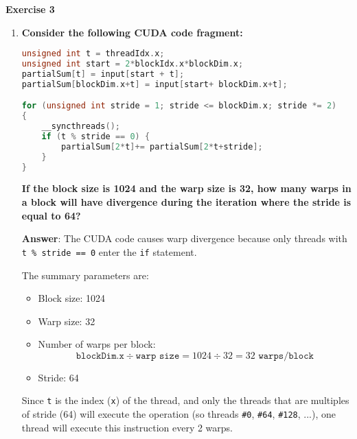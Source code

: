 \begin{flushleft}
    \textcolor{Green3}{ \textbf{Exercise 3}}
\end{flushleft}
\begin{enumerate}[label=\Alph*.]
    \item \textcolor{Green3}{\textbf{%
        Consider the following CUDA code fragment:
    }}
    \begin{lstlisting}[language=c++]
unsigned int t = threadIdx.x;
unsigned int start = 2*blockIdx.x*blockDim.x;
partialSum[t] = input[start + t];
partialSum[blockDim.x+t] = input[start+ blockDim.x+t];

for (unsigned int stride = 1; stride <= blockDim.x; stride *= 2)
{
    __syncthreads();
    if (t % stride == 0) {
        partialSum[2*t]+= partialSum[2*t+stride];
    }
}\end{lstlisting}
    \textcolor{Green3}{\textbf{If the block size is 1024 and the warp size is 32, how many warps in a block will have divergence during the iteration where the stride is equal to 64?}}

    \textbf{Answer}: The CUDA code causes warp divergence because only threads with \texttt{t \% stride == 0} enter the \texttt{if} statement.

    The summary parameters are:
    \begin{itemize}
        \item Block size: 1024
        \item Warp size: 32
        \item Number of warps per block:
        \begin{equation*}
            \texttt{blockDim.x} \div \texttt{warp size} = 1024 \div 32 = 32 \texttt{ warps/block}
        \end{equation*}
        \item Stride: 64
    \end{itemize}
    Since \texttt{t} is the index (\texttt{x}) of the thread, and only the threads that are multiples of stride (64) will execute the operation (so threads \texttt{\#0}, \texttt{\#64}, \texttt{\#128}, ...), one thread will execute this instruction every 2 warps.
    

\end{enumerate}
